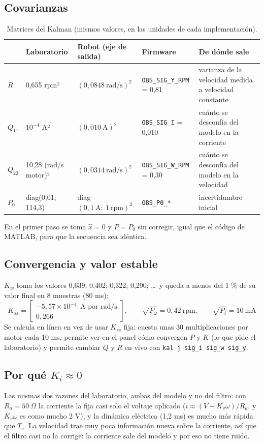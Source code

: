 \documentclass[11pt]{article}
\newcommand{\cod}[1]{\texttt{#1}}
\begin{document}
\subsection*{Covarianzas}
\begin{table}[H]\centering\small
\begin{tabular}{@{}lll>{\raggedright\arraybackslash}p{3.1cm}>{\raggedright\arraybackslash}p{4.4cm}@{}}
\toprule
 & Laboratorio & Robot (eje de salida) & Firmware & De dónde sale \\
\midrule
$R$ & 0,655 rpm² & $(0{,}0848\ \text{rad/s})^2$ & \cod{OBS\_SIG\_Y\_RPM} = 0,81 & varianza de la velocidad medida a velocidad constante \\
$Q_{11}$ & $10^{-4}$ A² & $(0{,}010\ \text{A})^2$ & \cod{OBS\_SIG\_I} = 0,010 & cuánto se desconfía del modelo en la corriente \\
$Q_{22}$ & 10,28 (rad/s motor)² & $(0{,}0314\ \text{rad/s})^2$ & \cod{OBS\_SIG\_W\_RPM} = 0,30 & cuánto se desconfía del modelo en la velocidad \\
$P_0$ & diag(0,01; 114,3) & diag$(0{,}1\ \text{A};\ 1\ \text{rpm})^2$ & \cod{OBS\_P0\_*} & incertidumbre inicial \\
\bottomrule
\end{tabular}
\caption{Matrices del Kalman (mismos valores, en las unidades de cada implementación).}
\label{tab:qr}
\end{table}
En el primer paso se toma $\hat x=0$ y $P=P_0$ sin corregir, igual que el código de MATLAB, para que la secuencia sea idéntica.

\subsection*{Convergencia y valor estable}
$K_w$ toma los valores 0,639; 0,402; 0,322; 0,290; \dots\ y queda a menos del 1 \% de su valor final en 8 muestras (80 ms):
\[
K_{ss}=\begin{bmatrix}-5{,}57\times10^{-4}\ \ \text{A por rad/s}\\ 0{,}266\end{bmatrix},\qquad \sqrt{P_{\omega}}=0{,}42\ \text{rpm},\qquad \sqrt{P_i}=10\ \text{mA}
\]
Se calcula en línea en vez de usar $K_{ss}$ fija: cuesta unas 30 multiplicaciones por motor cada 10 ms, permite ver en el panel cómo convergen $P$ y $K$ (lo que pide el laboratorio) y permite cambiar $Q$ y $R$ en vivo con \cod{kal j sig\_i sig\_w sig\_y}.

\subsection*{Por qué $K_i\approx0$}
Las mismas dos razones del laboratorio, ambas del modelo y no del filtro: con $R_a=50~\Omega$ la corriente la fija casi solo el voltaje aplicado ($i\approx(V-K_v\omega)/R_a$, y $K_v\omega$ es como mucho 2 V), y la dinámica eléctrica (1,2 ms) es mucho más rápida que $T_s$. La velocidad trae muy poca información nueva sobre la corriente, así que el filtro casi no la corrige: la corriente sale del modelo y por eso no tiene ruido.
\end{document}
